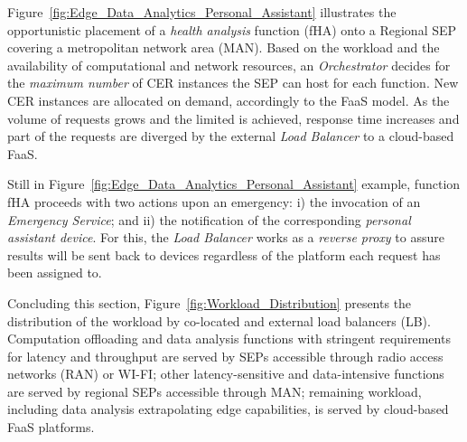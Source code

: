Figure~\ref{fig:Edge_Data_Analytics_Personal_Assistant} illustrates the opportunistic placement of a \textit{health analysis} function (fHA) onto a Regional SEP covering a metropolitan network area (MAN). Based on the workload and the availability of computational and network resources, an \textit{Orchestrator} decides for the \textit{maximum number} of CER instances the SEP can host for each function.
New CER instances are allocated on demand, accordingly to the FaaS model. As the volume of requests grows and the limited is achieved, response time increases and part of the requests are diverged
by the external \textit{Load Balancer} to a cloud-based FaaS.
%

Still in Figure~\ref{fig:Edge_Data_Analytics_Personal_Assistant} example, 
function fHA proceeds with two actions upon an emergency: i) the invocation of an 
\textit{Emergency Service}; and ii) the notification of the corresponding \textit{personal assistant device}. For this, the \textit{Load Balancer} works as a \textit{reverse proxy} to assure results will be sent back to devices regardless of the platform each request has been assigned to.

Concluding this section, 
Figure~\ref{fig:Workload_Distribution} presents the distribution of the workload by co-located and external load balancers (LB). Computation offloading and data analysis functions with stringent requirements for latency and throughput are served by SEPs accessible through radio access networks (RAN) or WI-FI;
other latency-sensitive and data-intensive functions are served by regional SEPs accessible through MAN; 
remaining workload, including data analysis extrapolating edge capabilities, is served by cloud-based FaaS platforms. 








